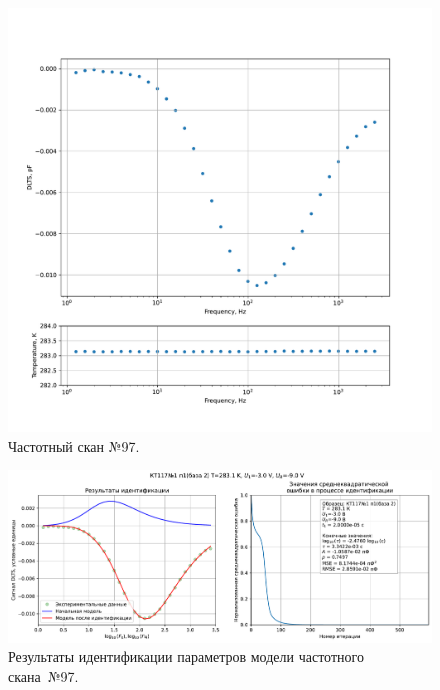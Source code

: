 \begin{figure}[!ht]
    \centering
    \includegraphics[width=1\textwidth]{../plots/КТ117№1_п1(база 2)_2500Гц-1Гц_1пФ_+10С_-3В-9В_200мВ_20мкс_шаг_0,1.pdf}
    \caption{Частотный скан №97.}
    \label{pic:frequency_scan_97}
\end{figure}

\begin{figure}[!ht]
    \centering
    \includegraphics[width=1\textwidth]{../plots/КТ117№1_п1(база 2)_2500Гц-1Гц_1пФ_+10С_-3В-9В_200мВ_20мкс_шаг_0,1_model.pdf}
    \caption{Результаты идентификации параметров модели частотного скана~№97.}
    \label{pic:frequency_scan_model97}
\end{figure}

\pagebreak


